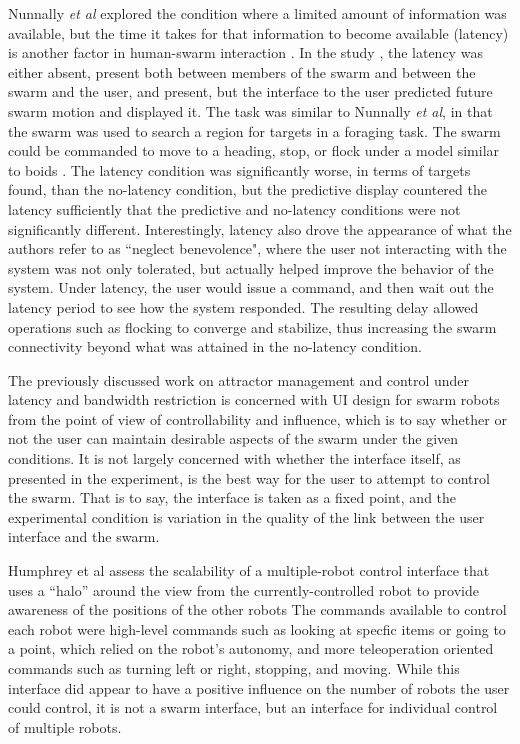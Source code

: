 Nunnally \emph{et al} explored the condition where a limited amount of information was available, but the time it takes for that information to become available (latency) is another factor in human-swarm interaction \citep{walker2012neglect}.
In the study , the latency was either absent, present both between members of the swarm and between the swarm and the user, and present, but the interface to the user predicted future swarm motion and displayed it. 
The task was similar to Nunnally \emph{et al}, in that the swarm was used to search a region for targets in a foraging task. 
The swarm could be commanded to move to a heading, stop, or flock under a model similar to boids \cite{reynolds1987flocks}.
The latency condition was significantly worse, in terms of targets found, than the no-latency condition, but the predictive display countered the latency sufficiently that the predictive and no-latency conditions were not significantly different. 
Interestingly, latency also drove the appearance of what the authors refer to as ``neglect benevolence", where the user not interacting with the system was not only tolerated, but actually helped improve the behavior of the system. 
Under latency, the user would issue a command, and then wait out the latency period to see how the system responded.
The resulting delay allowed operations such as flocking to converge and stabilize, thus increasing the swarm connectivity beyond what was attained in the no-latency condition. 

The previously discussed work on attractor management and control under latency and bandwidth restriction is concerned with UI design for swarm robots from the point of view of controllability and influence, which is to say whether or not the user can maintain desirable aspects of the swarm under the given conditions. 
It is not largely concerned with whether the interface itself, as presented in the experiment, is the best way for the user to attempt to control the swarm.
That is to say, the interface is taken as a fixed point, and the experimental condition is variation in the quality of the link between the user interface and the swarm. 

Humphrey et al assess the scalability of a multiple-robot control interface that uses a ``halo'' around the view from the currently-controlled robot to provide awareness of the positions of the other robots \citep{humphrey2007assessing}
The commands available to control each robot were high-level commands such as looking at specfic items or going to a point, which relied on the robot's autonomy, and more teleoperation oriented commands such as turning left or right, stopping, and moving. 
While this interface did appear to have a positive influence on the number of robots the user could control, it is not a swarm interface, but an interface for individual control of multiple robots. 

